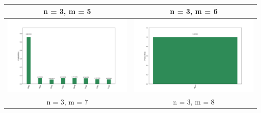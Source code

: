 \newpage
\begin{landscape}
\begin{table}[ht]
    \begin{tabular}{c c} 
        \hline
        n = 3, m = 5 & n = 3, m = 6 \\ \hline
        \includegraphics[scale=0.32]{Grover_results/Grover_n=3,m=5.png} & \includegraphics[scale=0.32]{Grover_results/Grover_n=3,m=6.png} \\ \hline
        n = 3, m = 7 & n = 3, m = 8 \\ \hline

\end{tabular}
\end{table}
\end{landscape}
